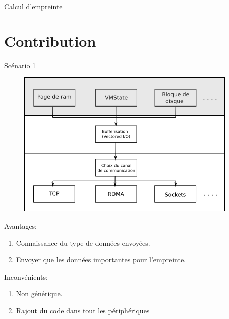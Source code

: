 \documentclass{libs/XJTLU_format}
\begin{document}
\begin{frame}{Calcul d'empreinte}
{    }

    
\end{frame}


\section{Contribution}
\begin{frame}{Scénario 1}
    \begin{figure}
        \centering
        \includegraphics[scale=0.5]{images/idea2.png}
    \end{figure}
    Avantages:
        \begin{enumerate}
            \item Connaissance du type de données envoyées.
            \item Envoyer que les données importantes pour l'empreinte.
        \end{enumerate}
        Inconvénients:
        \begin{enumerate}
            \item Non générique.
            \item Rajout du code dans tout les périphériques
        \end{enumerate}
\end{frame}
\end{document}
